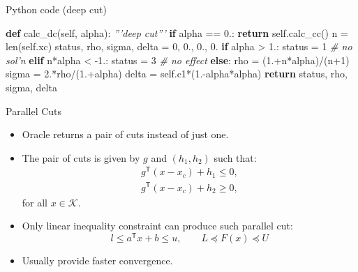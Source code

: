 \documentclass[10pt,ignorenonframetext,serif,onlymath]{beamer}
\newenvironment{Shaded}{}{}
\newcommand{\BuiltInTok}[1]{#1}
\newcommand{\CommentTok}[1]{\textcolor[rgb]{0.38,0.63,0.69}{\textit{#1}}}
\newcommand{\ControlFlowTok}[1]{\textcolor[rgb]{0.00,0.44,0.13}{\textbf{#1}}}
\newcommand{\DecValTok}[1]{\textcolor[rgb]{0.25,0.63,0.44}{#1}}
\newcommand{\FloatTok}[1]{\textcolor[rgb]{0.25,0.63,0.44}{#1}}
\newcommand{\KeywordTok}[1]{\textcolor[rgb]{0.00,0.44,0.13}{\textbf{#1}}}
\newcommand{\NormalTok}[1]{#1}
\newcommand{\OperatorTok}[1]{\textcolor[rgb]{0.40,0.40,0.40}{#1}}
\newcommand{\VariableTok}[1]{\textcolor[rgb]{0.10,0.09,0.49}{#1}}
\begin{document}
\begin{frame}[fragile]{Python code (deep cut)}
\protect\hypertarget{sec:python-code-deep-cut}{}

\begin{Shaded}
\begin{Highlighting}[]
    \KeywordTok{def}\NormalTok{ calc_dc(}\VariableTok{self}\NormalTok{, alpha):}
        \CommentTok{'''deep cut'''}
        \ControlFlowTok{if}\NormalTok{ alpha }\OperatorTok{==} \FloatTok{0.}\NormalTok{: }
            \ControlFlowTok{return} \VariableTok{self}\NormalTok{.calc_cc()}
\NormalTok{        n }\OperatorTok{=} \BuiltInTok{len}\NormalTok{(}\VariableTok{self}\NormalTok{.xc)}
\NormalTok{        status, rho, sigma, delta }\OperatorTok{=} \DecValTok{0}\NormalTok{, }\FloatTok{0.}\NormalTok{, }\FloatTok{0.}\NormalTok{, }\FloatTok{0.}
        \ControlFlowTok{if}\NormalTok{ alpha }\OperatorTok{>} \FloatTok{1.}\NormalTok{:}
\NormalTok{            status }\OperatorTok{=} \DecValTok{1}  \CommentTok{# no sol'n}
        \ControlFlowTok{elif}\NormalTok{ n}\OperatorTok{*}\NormalTok{alpha }\OperatorTok{<} \FloatTok{-1.}\NormalTok{:}
\NormalTok{            status }\OperatorTok{=} \DecValTok{3}  \CommentTok{# no effect}
        \ControlFlowTok{else}\NormalTok{:}
\NormalTok{            rho }\OperatorTok{=}\NormalTok{ (}\FloatTok{1.}\OperatorTok{+}\NormalTok{n}\OperatorTok{*}\NormalTok{alpha)}\OperatorTok{/}\NormalTok{(n}\OperatorTok{+}\DecValTok{1}\NormalTok{)}
\NormalTok{            sigma }\OperatorTok{=} \FloatTok{2.}\OperatorTok{*}\NormalTok{rho}\OperatorTok{/}\NormalTok{(}\FloatTok{1.}\OperatorTok{+}\NormalTok{alpha)}
\NormalTok{            delta }\OperatorTok{=} \VariableTok{self}\NormalTok{.c1}\OperatorTok{*}\NormalTok{(}\FloatTok{1.}\OperatorTok{-}\NormalTok{alpha}\OperatorTok{*}\NormalTok{alpha)}
        \ControlFlowTok{return}\NormalTok{ status, rho, sigma, delta}
\end{Highlighting}
\end{Shaded}

\end{frame}

\begin{frame}{Parallel Cuts}
\protect\hypertarget{sec:parallel-cuts}{}

\begin{itemize}
\item
  Oracle returns a pair of cuts instead of just one.
\item
  The pair of cuts is given by \(g\) and \((h_1, h_2)\) such that:
  \[\begin{array}{l}
  g^\mathsf{T} (x - x_c) + h_1 \leq 0,  \\
  g^\mathsf{T} (x - x_c) + h_2 \geq 0,
  \end{array}\] for all \(x \in \mathcal{K}\).
\item
  Only linear inequality constraint can produce such parallel cut:
  \[ l \leq a^\mathsf{T} x + b \leq u, \qquad L \preceq F(x) \preceq U \]
\item
  Usually provide faster convergence.
\end{itemize}

\end{frame}
\end{document}
